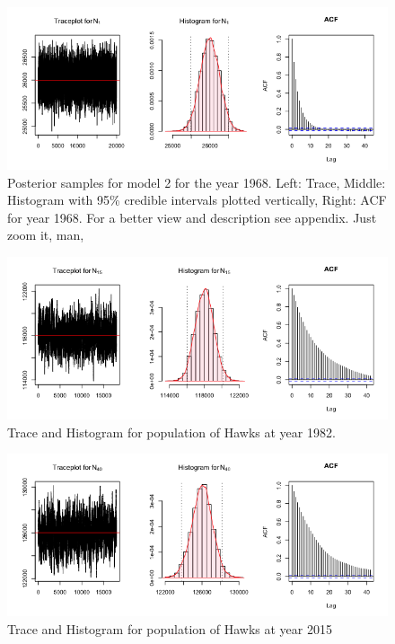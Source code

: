 \documentclass{asaproc}
\begin{document}
\begin{figure}[h!]
    \centering
    \includegraphics[scale=0.3]{N1_trace.png}
        \caption{Posterior samples for model 2 for the year 1968. Left: Trace, Middle: Histogram with 95\% credible intervals plotted vertically, Right: ACF for year 1968. For a better view and description see appendix. Just zoom it, man,}
    \label{traceN1}
\end{figure}
\begin{figure}[h!]
    \centering
    \includegraphics[scale=0.3]{N15.png}
    \caption{Trace and Histogram for population of Hawks at year 1982.}
    \label{traceN15}
\end{figure}
\begin{figure}[h!]
    \centering
    \includegraphics[scale=0.3]{N48.png}
    \caption{Trace and Histogram for population of Hawks at year 2015}
    \label{traceN48}
\end{figure}
\end{document}
